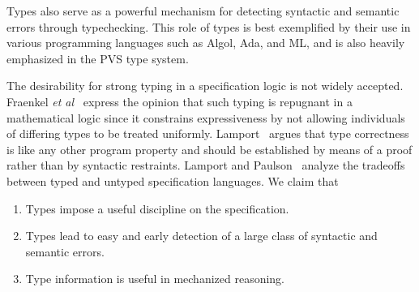 \documentclass [12pt,twoside]{cslreport}
\begin{document}
Types also serve as a powerful mechanism for detecting syntactic and
semantic errors through typechecking.  This role of types is best
exemplified by their use in various programming languages such as Algol,
Ada, and ML, and is also heavily emphasized in the PVS type
system.

The desirability for strong typing in a specification
logic is not widely accepted.  Fraenkel {\em et
al\/}~\cite{Fraenkel-etal84} express
the opinion that such 
typing is repugnant in a mathematical logic since it constrains
expressiveness by not allowing individuals of differing types to be
treated uniformly.  Lamport~\cite{TLA:TOPLAS94} argues that type
correctness is like any other 
program property and should be established by means of a proof rather than
by syntactic restraints.  Lamport and Paulson~\cite{Lamport&Paulson97}
analyze the tradeoffs between typed and untyped specification languages.  
We claim that
\begin{enumerate}
\item Types impose a useful discipline on the specification.
\item Types lead to easy and early detection of a large class of
syntactic and  semantic errors.
\item Type information is useful in mechanized reasoning.
\end{enumerate}


\begin{comment}
The first typed higher-order logic was the Principia Mathematica (PM) system of
Russell and Whitehead.  They were the first to propose a stratified
hierarchy of types as a means avoiding certain paradoxes.  The PM type
system is quite complicated.  Church proposed his \emph{simple theory of
types} as a higher-order logic based on a simply typed lambda calculus.
Church's system forms the basis for most modern higher-order logics
including that of PVS.  The Automath system of de~Bruijn pioneered the use
of dependent types (analogous to the variant records of Pascal) as a basis
for intuitionistic logic.\footnote{Similar ideas were 
independently proposed by several other researchers.}  Dependent types 
form an important component of the PVS type system.  
Girard and Reynolds, independently extended the typed lambda calculus
to a second-order or \emph{polymorphic} type system so that, for example,
an identity function for each type could be obtained by specializing a
generic identity function to the required type.
\end{comment}
\end{document}
